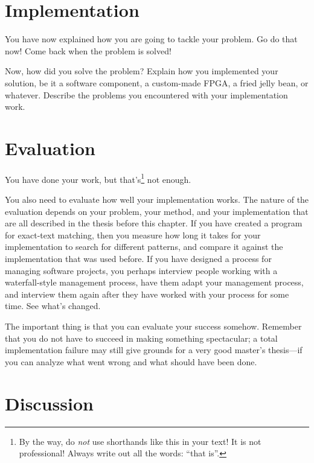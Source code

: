 \documentclass[12pt,a4paper,oneside,pdftex]{report}
\begin{document}
% 

\chapter{Implementation}
\label{chapter:implementation}

You have now explained how you are going to tackle your problem.
Go do that now! Come back when the problem is solved!

Now, how did you solve the problem?
Explain how you implemented your solution, be it a software component, a
custom-made FPGA, a fried jelly bean, or whatever.
Describe the problems you encountered with your implementation work.



% 

\chapter{Evaluation}
\label{chapter:evaluation}

You have done your work, but that's\footnote{By the way, do \emph{not} use
shorthands like this in your text! It is not professional! Always write out all
the words: ``that is''.} not enough.

You also need to evaluate how well your implementation works. The
nature of the evaluation depends on your problem, your method, and
your implementation that are all described in the thesis before this
chapter. If you have created a program for exact-text matching, then
you measure how long it takes for your implementation to search for
different patterns, and compare it against the implementation that was
used before. If you have designed a process for managing software
projects, you perhaps interview people working with a waterfall-style
management process, have them adapt your management process, and
interview them again after they have worked with your process for some
time. See what's changed.

The important thing is that you can evaluate your success somehow.
Remember that you do not have to succeed in making something spectacular; a
total implementation failure may still give grounds for a very good master's
thesis---if you can analyze what went wrong and what should have been done.




% 

\chapter{Discussion}
\label{chapter:discussion}
\end{document}
